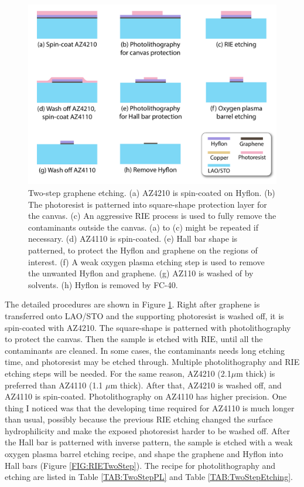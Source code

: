 \documentclass[pdflatex, sectionletters, 12pt]{pittetd}    %
\begin{document}
\begin{figure}[p]
	\centering
	\includegraphics[width=1\textwidth]{Drawing/TwoStepEtching.pdf}
	\caption{Two-step graphene etching. (a) AZ4210 is spin-coated on Hyflon. (b) The photoresist is patterned into square-shape protection layer for the canvas. (c) An aggressive RIE process is used to fully remove the contaminants outside the canvas. (a) to (c) might be repeated if necessary. (d) AZ4110 is spin-coated. (e) Hall bar shape is patterned, to protect the Hyflon and graphene on the regions of interest. (f) A weak oxygen plasma etching step is used to remove the unwanted Hyflon and graphene. (g) AZ110 is washed of by solvents. (h) Hyflon is removed by FC-40.}
	\label{FIG:TwoStepEtching}
\end{figure}

The detailed procedures are shown in Figure \ref{FIG:TwoStepEtching}. Right after graphene is transferred onto LAO/STO and the supporting photoresist is washed off, it is spin-coated with AZ4210. The square-shape is patterned with photolithography to protect the canvas. Then the sample is etched with RIE, until all the contaminants are cleaned. In some cases, the contaminants needs long etching time, and photoresist may be etched through. Multiple photolithography and RIE etching steps will be needed. For the same reason, AZ4210 (2.1$\mu$m thick) is preferred than AZ4110 (1.1 $\mu$m thick). After that, AZ4210 is washed off, and AZ4110 is spin-coated. Photolithography on AZ4110 has higher precision. One thing I noticed was that the developing time required for AZ4110 is much longer than usual, possibly because the previous RIE etching changed the surface hydrophilicity and make the exposed photoresist harder to be washed off. After the Hall bar is patterned with inverse pattern, the sample is etched with a weak oxygen plasma barrel etching recipe, and shape the graphene and Hyflon into Hall bars (Figure \ref{FIG:RIETwoStep}). The recipe for photolithography and etching are listed in Table \ref{TAB:TwoStepPL} and Table \ref{TAB:TwoStepEtching}.
\end{document}

